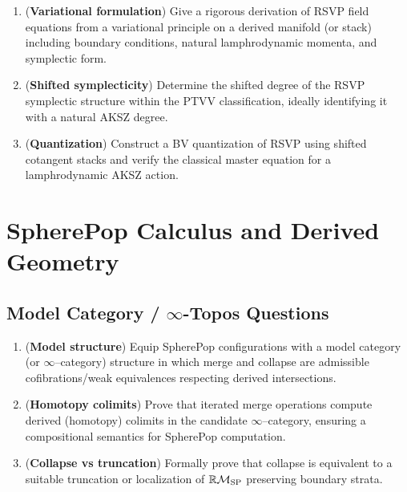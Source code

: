 \documentclass[12pt]{article}
\theoremstyle{plain}
\theoremstyle{definition}
\theoremstyle{remark}
\begin{document}
\begin{enumerate}
    \item ({\bf Variational formulation})
    Give a rigorous derivation of RSVP field equations from a variational
    principle on a derived manifold (or stack) including boundary conditions,
    natural lamphrodynamic momenta, and symplectic form.

    \item ({\bf Shifted symplecticity})
    Determine the shifted degree of the RSVP symplectic structure within the
    PTVV classification, ideally identifying it with a natural AKSZ degree.

    \item ({\bf Quantization})
    Construct a BV quantization of RSVP using shifted cotangent stacks and
    verify the classical master equation for a lamphrodynamic AKSZ action.
\end{enumerate}


\section{SpherePop Calculus and Derived Geometry}

\subsection{Model Category / $\infty$-Topos Questions}

\begin{enumerate}
    \item ({\bf Model structure})
    Equip SpherePop configurations with a model category (or $\infty$--category)
    structure in which merge and collapse are admissible cofibrations/weak
    equivalences respecting derived intersections.

    \item ({\bf Homotopy colimits})
    Prove that iterated merge operations compute derived (homotopy) colimits
    in the candidate $\infty$--category, ensuring a compositional semantics for
    SpherePop computation.

    \item ({\bf Collapse vs truncation})
    Formally prove that collapse is equivalent to a suitable truncation or
    localization of $\mathbb{R}\mathcal{M}_{\rm SP}$ preserving boundary strata.
\end{enumerate}
\end{document}
